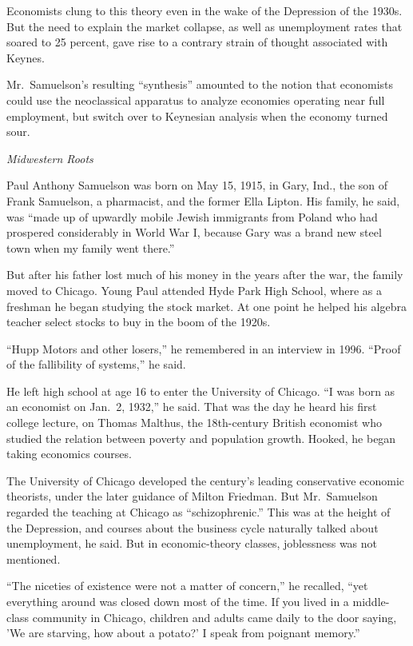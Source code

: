 ﻿\documentclass[12pt]{article}
\begin{document}
Economists clung to this theory even in the wake of the Depression of the 1930s. But the need to
explain the market collapse, as well as unemployment rates that soared to 25 percent, gave rise to a
contrary strain of thought associated with Keynes.

Mr.~Samuelson's resulting ``synthesis'' amounted to the notion that economists could use the
neoclassical apparatus to analyze economies operating near full employment, but switch over to
Keynesian analysis when the economy turned sour.

\emph{Midwestern Roots}

Paul Anthony Samuelson was born on May 15, 1915, in Gary, Ind., the son of Frank Samuelson, a
pharmacist, and the former Ella Lipton. His family, he said, was ``made up of upwardly mobile Jewish
immigrants from Poland who had prospered considerably in World War I, because Gary was a brand new
steel town when my family went there.''

But after his father lost much of his money in the years after the war, the family moved to Chicago.
Young Paul attended Hyde Park High School, where as a freshman he began studying the stock market.
At one point he helped his algebra teacher select stocks to buy in the boom of the 1920s.

``Hupp Motors and other losers,'' he remembered in an interview in 1996. ``Proof of the fallibility
of systems,'' he said.

He left high school at age 16 to enter the University of Chicago. ``I was born as an economist on
Jan.~2, 1932,'' he said. That was the day he heard his first college lecture, on Thomas Malthus, the
18th-century British economist who studied the relation between poverty and population growth.
Hooked, he began taking economics courses.

The University of Chicago developed the century's leading conservative economic theorists, under the
later guidance of Milton Friedman. But Mr.~Samuelson regarded the teaching at Chicago as
``schizophrenic.'' This was at the height of the Depression, and courses about the business cycle
naturally talked about unemployment, he said. But in economic-theory classes, joblessness was not
mentioned.

``The niceties of existence were not a matter of concern,'' he recalled, ``yet everything around was
closed down most of the time. If you lived in a middle-class community in Chicago, children and
adults came daily to the door saying, 'We are starving, how about a potato?' I speak from poignant
memory.''
\end{document}
